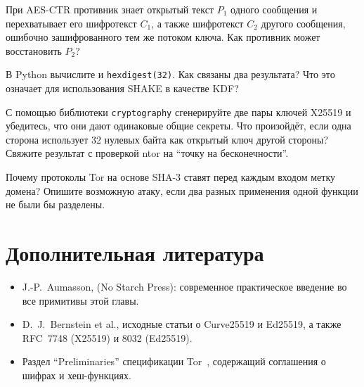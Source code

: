 \begin{esercizio}[1]\label{es:05-xor}
При AES-CTR противник знает открытый текст $P_1$ одного сообщения и перехватывает его шифротекст $C_1$, а также шифротекст $C_2$ другого сообщения, ошибочно зашифрованного тем же потоком ключа. Как противник может восстановить $P_2$?
\end{esercizio}

\begin{esercizio}[1]\label{es:05-shake}
В Python вычислите  и \texttt{hexdigest(32)}. Как связаны два результата? Что это означает для использования SHAKE в качестве KDF?
\end{esercizio}

\begin{esercizio}[2]\label{es:05-dh}
С помощью библиотеки \texttt{cryptography} сгенерируйте две пары ключей X25519 и убедитесь, что они дают одинаковые общие секреты. Что произойдёт, если одна сторона использует 32 нулевых байта как открытый ключ другой стороны? Свяжите результат с проверкой ntor на \enquote{точку на бесконечности}.
\end{esercizio}

\begin{esercizio}[2]\label{es:05-etichette}
Почему протоколы Tor на основе SHA-3 ставят перед каждым входом метку домена? Опишите возможную атаку, если два разных применения одной функции не были бы разделены.
\end{esercizio}

\section*{Дополнительная литература}
\begin{itemize}
  \item J.-P.~Aumasson,  (No Starch Press): современное практическое введение во все примитивы этой главы.
  \item D.~J.~Bernstein et al., исходные статьи о Curve25519 и Ed25519, а также RFC~7748 (X25519) и 8032 (Ed25519).
  \item Раздел \enquote{Preliminaries} спецификации Tor~\cite{torspec}, содержащий соглашения о шифрах и хеш-функциях.
\end{itemize}
